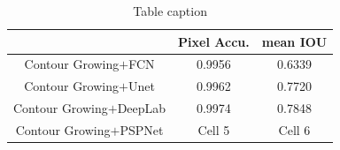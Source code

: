 \begin{table}[t]
\begin{center}
\caption{Table caption} \label{tab:report2}
\begin{tabular}{|c|c|c|}
  \hline
   & Pixel Accu. & mean IOU
  \\
  \hline
  Contour Growing$+$FCN & 0.9956 & 0.6339 \\
  Contour Growing$+$Unet & 0.9962 & 0.7720 \\
  Contour Growing$+$DeepLab & 0.9974 & 0.7848 \\
  Contour Growing$+$PSPNet & Cell 5 & Cell 6 \\
  \hline
\end{tabular}
\end{center}
\end{table}
